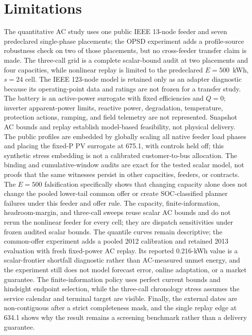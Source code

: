 \documentclass[11pt]{article}
\begin{document}
\section{Limitations}
The quantitative AC study uses one public IEEE 13-node feeder and seven predeclared single-phase placements; the OPSD experiment adds a profile-source robustness check on two of those placements, but no cross-feeder transfer claim is made. The three-call grid is a complete scalar-bound audit at two placements and four capacities, while nonlinear replay is limited to the predeclared \(E=500\)~kWh, \(s=24\) cell. The IEEE 123-node model is retained only as an adapter diagnostic because its operating-point data and ratings are not frozen for a transfer study. The battery is an active-power surrogate with fixed efficiencies and \(Q=0\); inverter apparent-power limits, reactive power, degradation, temperature, protection actions, ramping, and field telemetry are not represented. Snapshot AC bounds and replay establish model-based feasibility, not physical delivery. The public profiles are embedded by globally scaling all native feeder load phases and placing the fixed-P PV surrogate at 675.1, with controls held off; this synthetic stress embedding is not a calibrated customer-to-bus allocation. The binding and cumulative-window audits are exact for the tested scalar model, not proofs that the same witnesses persist in other capacities, feeders, or contracts. The \(E=500\) falsification specifically shows that changing capacity alone does not change the pooled lower-tail common offer or create SOC-classified planner failures under this feeder and offer rule. The capacity, finite-information, headroom-margin, and three-call sweeps reuse scalar AC bounds and do not rerun the nonlinear feeder for every cell; they are dispatch sensitivities under frozen audited scalar bounds. The quantile curves remain descriptive; the common-offer experiment adds a pooled 2012 calibration and retained 2013 evaluation with fresh fixed-power AC replay. Its reported 0.216-kWh value is a scalar-frontier shortfall diagnostic rather than AC-measured unmet energy, and the experiment still does not model forecast error, online adaptation, or a market guarantee. The finite-information policy uses perfect current bounds and hindsight endpoint selection, while the three-call chronology stress assumes the service calendar and terminal target are visible. Finally, the external dates are non-contiguous after a strict completeness mask, and the single replay edge at 634.1 shows why the result remains a screening benchmark rather than a delivery guarantee.
\end{document}
